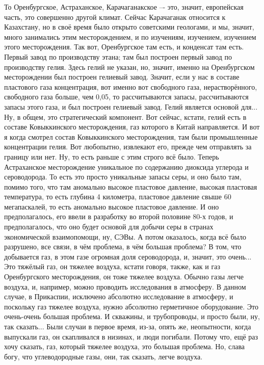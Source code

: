 \documentclass[main.tex]{subfiles}
\begin{document}
То Оренбургское, Астраханское, Карачаганакское –- это, значит, европейская часть,
это совершенно другой климат.
Сейчас Карачаганак относится к Казахстану, но в своё время было открыто советскими геологами,
и мы, значит, много занимались этим месторождением, и по изучениям, изучением, изучением этого месторождения.
Так вот, Оренбургское там есть, и конденсат там есть.
Первый завод по производству этана; там был построен первый завод по производству гелия.
Здесь гелий не указан, но, значит, именно на Оренбургском месторождении был построен гелиевый завод.
Значит, если у нас в составе пластового газа концентрация, вот именно вот свободного газа, нерастворённого, свободного газа больше, чем 0,05, то рассчитываются запасы, рассчитываются запасы этого газа, и был построен гелиевый завод.
Гелий является основой для...
Ну, в общем, это стратегический компонент.
Вот сейчас, кстати, гелий есть в составе Ковыккинского месторождения, газ которого в Китай направляется.
И вот я когда смотрел состав Ковыккинского месторождения, там были промышленные концентрации гелия.
Вот любопытно, извлекают его, прежде чем отправлять за границу или нет.
Ну, то есть раньше с этим строго всё было.
Теперь Астраханское месторождение уникальное по содержанию диоксида углерода и сероводорода.
То есть это просто уникальные запасы серы, и оно было там, помимо того, что там аномально высокое пластовое давление, высокая пластовая температура, то есть глубина 4 километра, пластовое давление свыше 60 мегапаскалей, то есть аномально высокое пластовое давление.
И оно предполагалось, его ввели в разработку во второй половине 80-х годов, и предполагалось, что оно будет основой для добычи серы в странах экономической взаимопомощи, ну, СЭВы.
А потом оказалось, когда всё было разрушено, все связи, в чём проблема, в чём большая проблема?
В том, что добывается газ, в этом газе огромная доля сероводорода, и, значит, это очень...
Это тяжёлый газ, он тяжелее воздуха, кстати говоря, также, как и газ Оренбургского месторождения, он тоже тяжелее воздуха.
Обычно газы легче воздуха, и, например, можно проводить исследования в атмосферу.
В данном случае, в Прикаспии, исключено абсолютно исследование в атмосферу, и поскольку газ тяжелее воздуха, нужно абсолютно герметичное оборудование.
Это очень-очень большая проблема.
И скважины, и трубопроводы, и просто были, ну, так сказать...
Были случаи в первое время, из-за, опять же, неопытности, когда выпускали газ, он скапливался в низинах, и люди погибали.
Потому что, ещё раз хочу сказать, газ, который тяжелее воздуха, это большая проблема.
Но, слава богу, что углеводородные газы, они, так сказать, легче воздуха.
\end{document}
